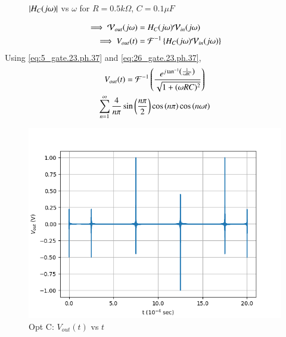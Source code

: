 \documentclass[journal,12pt,twocolumn]{IEEEtran}
\theoremstyle{remark}
\begin{document}
\begin{enumerate}
\begin{figure}[!h]
        \caption{$\left\vert H_C(j\omega)\right\vert$ vs $\omega$ for $R=0.5k\Omega$, $C=0.1\mu F$}
        \label{fig:opt_c_hf_gate.ph.23.37}
    \end{figure}
    \begin{align}
        \implies \mathcal{V}_{out}(j\omega) &= H_C(j\omega)\mathcal{V}_{in}(j\omega)\\
        \implies V_{out}(t) &= \mathcal{F}^{-1}\left\{H_C(j\omega)\mathcal{V}_{in}(j\omega)\right\}
    \end{align}
     Using \eqref{eq:5_gate.23.ph.37} and \eqref{eq:26_gate.23.ph.37}, 
    \begin{multline}
    V_{out}(t)=\mathcal{F}^{-1}\left(\frac{e^{j\tan^{-1}\left(\frac{1}{\omega RC}\right)}}{\sqrt{1 + (\omega R C)^2}}\right)\\ \sum_{n = 1}^{\infty}\frac{4}{n\pi}\sin{\ensuremath{\left(\frac{n\pi}{2}\right)}}\cos\left({n\pi}\right) \cos{\ensuremath{\left(n\omega t\right)}}
    \end{multline}
    \begin{figure}[!h]
        \centering
        \includegraphics[width = \columnwidth]{figs/opt_c_res.png}
        \caption{Opt C: $V_{out}(t)$ vs $t$}
        \label{fig:opt_c_res_gate.23.ph.37}
    \end{figure}
    

\end{enumerate}
\end{document}
